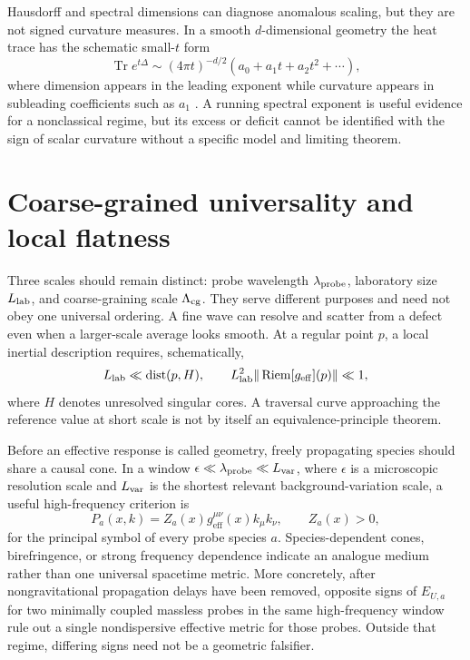 \documentclass[aps,prd,twocolumn,amsmath,amssymb,nofootinbib]{revtex4-2}
\newcommand{\eff}{\mathrm{eff}}
\begin{document}
Hausdorff and spectral dimensions can diagnose anomalous scaling, but they are
not signed curvature measures.  In a smooth $d$-dimensional geometry the heat
trace has the schematic small-$t$ form
\begin{equation}
 \operatorname{Tr}e^{t\Delta}
 \sim(4\pi t)^{-d/2}\left(a_0+a_1t+a_2t^2+\cdots\right),
 \label{eq:heattrace}
\end{equation}
where dimension appears in the leading exponent while curvature appears in
subleading coefficients such as $a_1$ \cite{vassilevich-2003}.  A running
spectral exponent is useful evidence for a nonclassical regime, but its excess
or deficit cannot be identified with the sign of scalar curvature without a
specific model and limiting theorem.

\section{Coarse-grained universality and local flatness}
\label{sec:universality}

Three scales should remain distinct: probe wavelength $\lambda_{\rm probe}$,
laboratory size $L_{\rm lab}$, and coarse-graining scale $\Lambda_{\rm cg}$.
They serve different purposes and need not obey one universal ordering.  A
fine wave can resolve and scatter from a defect even when a larger-scale
average looks smooth.  At a regular point $p$, a local inertial description
requires, schematically,
\begin{equation}
 L_{\rm lab}\ll\operatorname{dist}(p,H),
 \qquad
 L_{\rm lab}^2\|\operatorname{Riem}[g_{\eff}](p)\|\ll1,
 \label{eq:localflatness}
\end{equation}
where $H$ denotes unresolved singular cores.  A traversal curve approaching
the reference value at short scale is not by itself an equivalence-principle
theorem.

Before an effective response is called geometry, freely propagating species
should share a causal cone.  In a window
$\epsilon\ll\lambda_{\rm probe}\ll L_{\rm var}$, where $\epsilon$ is a
microscopic resolution scale and $L_{\rm var}$ is the shortest relevant
background-variation scale, a useful high-frequency criterion is
\begin{equation}
 P_a(x,k)=Z_a(x)g_{\eff}^{\mu\nu}(x)k_{\mu}k_{\nu},
 \qquad Z_a(x)>0,
 \label{eq:universality}
\end{equation}
for the principal symbol of every probe species $a$.  Species-dependent cones,
birefringence, or strong frequency dependence indicate an analogue medium
rather than one universal spacetime metric.  More concretely, after
nongravitational propagation delays have been removed, opposite signs of
$E_{U,a}$ for two minimally coupled massless probes in the same
high-frequency window rule out a single nondispersive effective metric for
those probes.  Outside that regime, differing signs need not be a geometric
falsifier.
\end{document}
